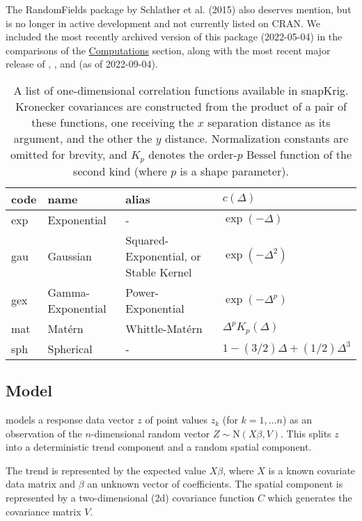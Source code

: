 The RandomFields package by Schlather et al. (2015) also deserves mention, but is no longer in active development and not currently listed on CRAN. We included the most recently archived version of this package (2022-05-04) in the comparisons of the \protect\hyperlink{computations}{Computations} section, along with the most recent major release of , , and  (as of 2022-09-04).

\begin{table}

\caption{\label{tab:cfun-table-latex}A list of one-dimensional correlation functions available in snapKrig. Kronecker covariances are constructed from the product of a pair of these functions, one receiving the $x$ separation distance as its argument, and the other the $y$ distance. Normalization constants are omitted for brevity, and $K_p$ denotes the order-$p$ Bessel function of the second kind (where $p$ is a shape parameter).}
\centering
\fontsize{9}{11}\selectfont
\begin{tabular}[t]{llll}
\toprule
code & name & alias & $c\left( \Delta \right)$\\
\midrule
exp & Exponential & - & $\exp\left( -\Delta \right)$\\
gau & Gaussian & Squared-Exponential, or Stable Kernel & $\exp\left( -\Delta^2 \right)$\\
gex & Gamma-Exponential & Power-Exponential & $\exp\left( -\Delta^p \right)$\\
mat & Mat\'ern & Whittle-Mat\'ern & $\Delta^p K_p\left( \Delta \right)$\\
sph & Spherical & - & $1 - (3/2)\Delta + (1/2)\Delta^3$\\
\bottomrule
\end{tabular}
\end{table}

\hypertarget{model}{%
\subsection{Model}\label{model}}

 models a response data vector \(z\) of point values \(z_k\) (for \(k=1,\dots n\)) as an observation of the \(n\)-dimensional random vector \(Z \sim \text{N} \left( X\beta, V \right)\). This splits \(z\) into a deterministic trend component and a random spatial component.

The trend is represented by the expected value \(X\beta\), where \(X\) is a known covariate data matrix and \(\beta\) an unknown vector of coefficients. The spatial component is represented by a two-dimensional (2d) covariance function \(C\) which generates the covariance matrix \(V\).

